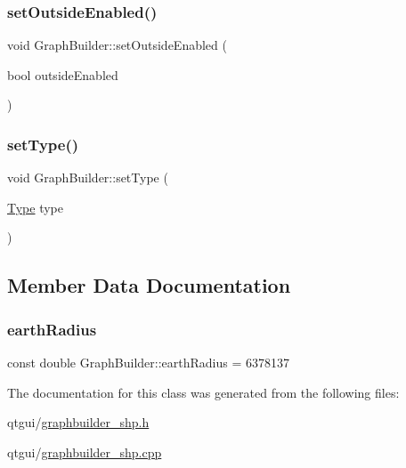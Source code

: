 \subsubsection{\texorpdfstring{setOutsideEnabled()}{setOutsideEnabled()}}
{\footnotesize\ttfamily void Graph\+Builder\+::set\+Outside\+Enabled (\begin{DoxyParamCaption}\item[{bool}]{outside\+Enabled }\end{DoxyParamCaption})}

\mbox{\label{class_graph_builder_a939a4b50dd99194d3f892716ad67c997}} 
\subsubsection{\texorpdfstring{setType()}{setType()}}
{\footnotesize\ttfamily void Graph\+Builder\+::set\+Type (\begin{DoxyParamCaption}\item[{\mbox{\hyperlink{class_graph_builder_ad9125786780ea834b0368c7a599bb5d9}{Type}}}]{type }\end{DoxyParamCaption})\hspace{0.3cm}{\ttfamily [inline]}}



\subsection{Member Data Documentation}
\mbox{\label{class_graph_builder_a16076357d9b569b4c2a0fb58b34774b0}} 
\subsubsection{\texorpdfstring{earthRadius}{earthRadius}}
{\footnotesize\ttfamily const double Graph\+Builder\+::earth\+Radius = 6378137\hspace{0.3cm}{\ttfamily [static]}}



The documentation for this class was generated from the following files\+:\begin{DoxyCompactItemize}
\item 
qtgui/\mbox{\hyperlink{graphbuilder__shp_8h}{graphbuilder\+\_\+shp.\+h}}\item 
qtgui/\mbox{\hyperlink{graphbuilder__shp_8cpp}{graphbuilder\+\_\+shp.\+cpp}}\end{DoxyCompactItemize}
